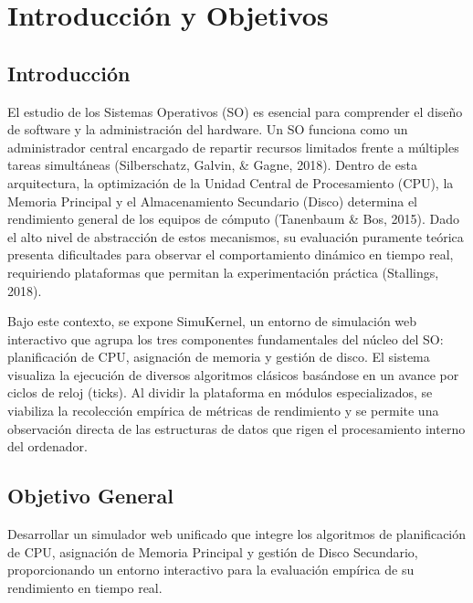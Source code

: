 \documentclass[12pt,a4paper]{article}
\begin{document}
\section{Introducción y Objetivos}

\subsection{Introducción}

El estudio de los Sistemas Operativos (SO) es esencial para comprender el diseño de software y la administración del hardware. Un SO funciona como un administrador central encargado de repartir recursos limitados frente a múltiples tareas simultáneas (Silberschatz, Galvin, \& Gagne, 2018). Dentro de esta arquitectura, la optimización de la Unidad Central de Procesamiento (CPU), la Memoria Principal y el Almacenamiento Secundario (Disco) determina el rendimiento general de los equipos de cómputo (Tanenbaum \& Bos, 2015). Dado el alto nivel de abstracción de estos mecanismos, su evaluación puramente teórica presenta dificultades para observar el comportamiento dinámico en tiempo real, requiriendo plataformas que permitan la experimentación práctica (Stallings, 2018).

Bajo este contexto, se expone SimuKernel, un entorno de simulación web interactivo que agrupa los tres componentes fundamentales del núcleo del SO: planificación de CPU, asignación de memoria y gestión de disco. El sistema visualiza la ejecución de diversos algoritmos clásicos basándose en un avance por ciclos de reloj (ticks). Al dividir la plataforma en módulos especializados, se viabiliza la recolección empírica de métricas de rendimiento y se permite una observación directa de las estructuras de datos que rigen el procesamiento interno del ordenador.

\subsection{Objetivo General}
Desarrollar un simulador web unificado que integre los algoritmos de planificación de CPU, asignación de Memoria Principal y gestión de Disco Secundario, proporcionando un entorno interactivo para la evaluación empírica de su rendimiento en tiempo real.
\end{document}
